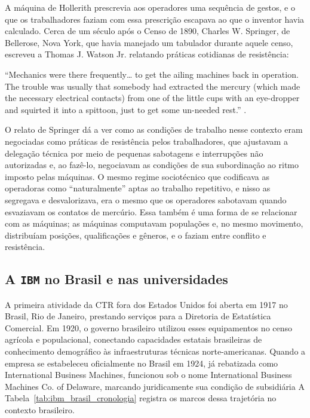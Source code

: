 A máquina de Hollerith prescrevia aos operadores uma sequência de gestos, e o que os trabalhadores faziam com essa prescrição escapava ao que o inventor havia calculado. Cerca de um século após o Censo de 1890, Charles W. Springer, de Bellerose, Nova York, que havia manejado um tabulador durante aquele censo, escreveu a Thomas J. Watson Jr. relatando práticas cotidianas de resistência:

\begin{citacaoabnt}
``Mechanics were there frequently\ldots{} to get the ailing machines back in operation. The trouble was usually that somebody had extracted the mercury (which made the necessary electrical contacts) from one of the little cups with an eye-dropper and squirted it into a spittoon, just to get some un-needed rest.'' \parencite[p.~72]{Austrian1982Hollerith}.
\end{citacaoabnt}

O relato de Springer dá a ver como as condições de trabalho nesse contexto eram negociadas como práticas de resistência pelos trabalhadores, que ajustavam a delegação técnica por meio de pequenas sabotagens e interrupções não autorizadas e, ao fazê-lo, negociavam as condições de sua subordinação ao ritmo imposto pelas máquinas. O mesmo regime sociotécnico que codificava as operadoras como \enquote{naturalmente} aptas ao trabalho repetitivo, e nisso as segregava e desvalorizava, era o mesmo que os operadores sabotavam quando esvaziavam os contatos de mercúrio. Essa também é uma forma de se relacionar com as máquinas; as máquinas computavam populações e, no mesmo movimento, distribuíam posições, qualificações e gêneros, e o faziam entre conflito e resistência. %

\subsection{A \texttt{IBM} no Brasil e nas universidades}
\label{subsec:ibm_brasil_universidades}

A primeira atividade da CTR fora dos Estados Unidos foi aberta em 1917 no Brasil, Rio de Janeiro, prestando serviços para a Diretoria de Estatística Comercial. Em 1920, o governo brasileiro utilizou esses equipamentos no censo agrícola e populacional, conectando capacidades estatais brasileiras de conhecimento demográfico às infraestruturas técnicas norte-americanas. Quando a empresa se estabeleceu oficialmente no Brasil em 1924, já rebatizada como International Business Machines, funcionou sob o nome International Business Machines Co. of Delaware, marcando juridicamente sua condição de subsidiária \parencite{IBM_Brasil_100} A Tabela~\ref{tab:ibm_brasil_cronologia} registra os marcos dessa trajetória no contexto brasileiro.

